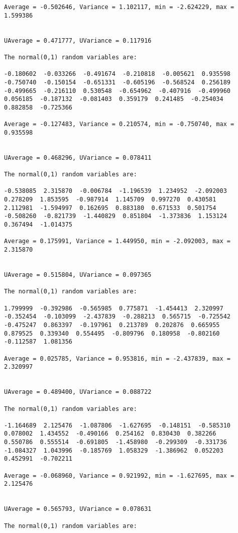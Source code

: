 \documentclass{article}
\begin{document}
{\begin{verbatim}
Average = -0.502646, Variance = 1.102117, min = -2.624229, max = 1.599386 


UAverage = 0.471777, UVariance = 0.117916

The normal(0,1) random variables are:

-0.180602  -0.033266  -0.491674  -0.210818  -0.005621  0.935598  
-0.750740  -0.150154  -0.651331  -0.605196  -0.568524  0.256189  
-0.499665  -0.216110  0.530548  -0.654962  -0.407916  -0.499960  
0.056185  -0.187132  -0.081403  0.359179  0.241485  -0.254034  
0.882858  -0.725366  

Average = -0.127483, Variance = 0.210574, min = -0.750740, max = 0.935598 


UAverage = 0.468296, UVariance = 0.078411

The normal(0,1) random variables are:

-0.538085  2.315870  -0.006784  -1.196539  1.234952  -2.092003  
0.278209  1.853595  -0.987914  1.145709  0.997270  0.430581  
2.112981  -1.594997  0.162695  0.883180  0.671533  0.501754  
-0.508260  -0.821739  -1.440829  0.851804  -1.373836  1.153124  
0.367494  -1.014375  

Average = 0.175991, Variance = 1.449950, min = -2.092003, max = 2.315870 


UAverage = 0.515804, UVariance = 0.097365

The normal(0,1) random variables are:

1.799999  -0.392986  -0.565985  0.775871  -1.454413  2.320997  
-0.352454  -0.103099  -2.437839  -0.288213  0.565715  -0.725542  
-0.475247  0.863397  -0.197961  0.213789  0.202876  0.665955  
0.879525  0.339340  0.554495  -0.809796  0.180958  -0.802160  
-0.112587  1.081356  

Average = 0.025785, Variance = 0.953816, min = -2.437839, max = 2.320997 


UAverage = 0.489400, UVariance = 0.088722

The normal(0,1) random variables are:

-1.164689  2.125476  -1.087806  -1.627695  -0.148151  -0.585310  
0.078002  1.434552  -0.490166  0.254162  0.830430  0.382266  
0.550786  0.555514  -0.691805  -1.458980  -0.299309  -0.331736  
-1.084327  1.043996  -0.185769  1.058329  -1.386962  0.052203  
0.452991  -0.702211  

Average = -0.068960, Variance = 0.921992, min = -1.627695, max = 2.125476 


UAverage = 0.565793, UVariance = 0.078631

The normal(0,1) random variables are:


\end{verbatim}}
\end{document}
